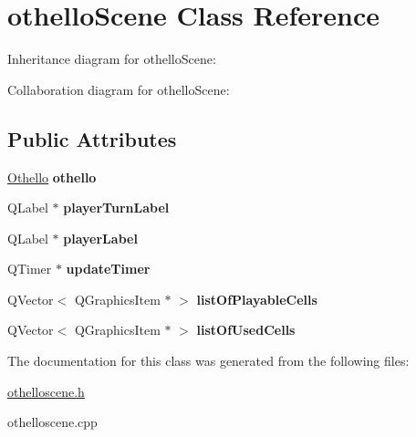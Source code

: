 \hypertarget{classothelloScene}{}\section{othello\+Scene Class Reference}
\label{classothelloScene}


Inheritance diagram for othello\+Scene\+:


Collaboration diagram for othello\+Scene\+:
\subsection*{Public Attributes}
\begin{DoxyCompactItemize}
\item 
\mbox{\label{classothelloScene_a420cf953adf3e1a441fb65bbe4d257f1}} 
\hyperlink{classOthello}{Othello} {\bfseries othello}
\item 
\mbox{\label{classothelloScene_a7823d3315d98fb10c3e2fbb08c48114f}} 
Q\+Label $\ast$ {\bfseries player\+Turn\+Label}
\item 
\mbox{\label{classothelloScene_a8624b99784fe42ed40799eef7a89277c}} 
Q\+Label $\ast$ {\bfseries player\+Label}
\item 
\mbox{\label{classothelloScene_a62bfc0b54bbf288478953bf24301f1b8}} 
Q\+Timer $\ast$ {\bfseries update\+Timer}
\item 
\mbox{\label{classothelloScene_acfe8145f622f9577139ea6235d9c8e40}} 
Q\+Vector$<$ Q\+Graphics\+Item $\ast$ $>$ {\bfseries list\+Of\+Playable\+Cells}
\item 
\mbox{\label{classothelloScene_a577cae658093d5caad925213d51ea3de}} 
Q\+Vector$<$ Q\+Graphics\+Item $\ast$ $>$ {\bfseries list\+Of\+Used\+Cells}
\end{DoxyCompactItemize}


The documentation for this class was generated from the following files\+:\begin{DoxyCompactItemize}
\item 
\hyperlink{othelloscene_8h}{othelloscene.\+h}\item 
othelloscene.\+cpp\end{DoxyCompactItemize}
